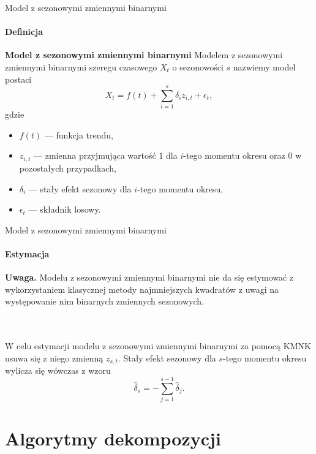 \documentclass[a4paper, 11pt]{beamer}
\begin{document}
	\begin{frame}{Model z sezonowymi zmiennymi binarnymi}
		\framesubtitle{Definicja}
		\begin{block}{\textbf{Model z sezonowymi zmiennymi binarnymi}}
			Modelem z sezonowymi zmiennymi binarnymi szeregu czasowego $X_t$ o 
			sezonowości $s$ nazwiemy model postaci \[
				X_t = f\left(t\right) + \sum_{i=1}^{s} \delta_i z_{i,t} + \epsilon_t,
			\]
			gdzie
			\begin{itemize}
				\item $f\left(t\right)$ --- funkcja trendu,
				\item $z_{i,t}$ --- zmienna przyjmująca wartość $1$ dla $i$-tego momentu
					okresu oraz $0$ w pozostałych przypadkach,
				\item $\delta_i$ --- stały efekt sezonowy dla $i$-tego momentu okresu,
				\item $\epsilon_t$ --- składnik losowy.
			\end{itemize}
		\end{block}
	\end{frame}
	
	\begin{frame}{Model z sezonowymi zmiennymi binarnymi}
		\framesubtitle{Estymacja}
		\begin{alert}{\textbf{Uwaga.}}
			Modelu z sezonowymi zmiennymi binarnymi nie da się estymować z 
			wykorzystaniem klasycznej metody najmniejszych kwadratów z uwagi na
			występowanie nim binarnych zmiennych sezonowych.
		\end{alert}
		\\~\\
		W celu estymacji modelu z sezonowymi zmiennymi binarnymi za pomocą KMNK
		usuwa się z niego zmienną $z_{s,t}.$ Stały efekt sezonowy dla $s$-tego
		momentu okresu wylicza się wówczas z wzoru \[
			\hat{\delta}_s = -\sum_{j=1}^{s-1} \hat{\delta}_j.
		\]
	\end{frame}
	
	\section{Algorytmy dekompozycji}
\end{document}
